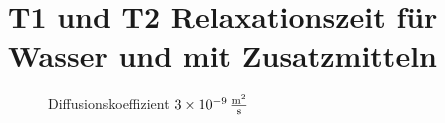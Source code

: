 \section{T1 und T2 Relaxationszeit für Wasser und mit Zusatzmitteln}
\begin{figure}[H]
    \centering
    
    \caption{Diffusionskoeffizient $\SI{3e-9}{\frac{\m^2}{s}}$}
\end{figure}
